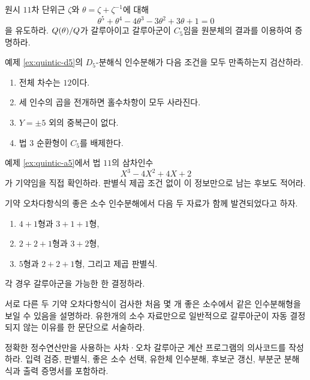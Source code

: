 \begin{exercise}[*]
원시 $11$차 단위근 $\zeta$와 $\theta=\zeta+\zeta^{-1}$에 대해
\[
  \theta^5+\theta^4-4\theta^3-3\theta^2+3\theta+1=0
\]
을 유도하라. $Q(\theta)/Q$가 갈루아이고 갈루아군이 $C_5$임을 원분체의 결과를 이용하여 증명하라.
\end{exercise}

\begin{exercise}
예제 \ref{ex:quintic-d5}의 $D_5$-분해식 인수분해가 다음 조건을 모두 만족하는지 검산하라.
\begin{enumerate}[label=(\alph*)]
  \item 전체 차수는 $12$이다.
  \item 세 인수의 곱을 전개하면 홀수차항이 모두 사라진다.
  \item $Y=\pm5$ 외의 중복근이 없다.
  \item 법 $3$ 순환형이 $C_5$를 배제한다.
\end{enumerate}
\end{exercise}

\begin{exercise}
예제 \ref{ex:quintic-a5}에서 법 $11$의 삼차인수
\[
  X^3-4X^2+4X+2
\]
가 기약임을 직접 확인하라. 판별식 제곱 조건 없이 이 정보만으로 남는 후보도 적어라.
\end{exercise}

\begin{exercise}
기약 오차다항식의 좋은 소수 인수분해에서 다음 두 자료가 함께 발견되었다고 하자.
\begin{enumerate}[label=(\alph*)]
  \item $4+1$형과 $3+1+1$형,
  \item $2+2+1$형과 $3+2$형,
  \item $5$형과 $2+2+1$형, 그리고 제곱 판별식.
\end{enumerate}
각 경우 갈루아군을 가능한 한 결정하라.
\end{exercise}

\begin{exercise}
서로 다른 두 기약 오차다항식이 검사한 처음 몇 개 좋은 소수에서 같은 인수분해형을 보일 수 있음을 설명하라. 유한개의 소수 자료만으로 일반적으로 갈루아군이 자동 결정되지 않는 이유를 한 문단으로 서술하라.
\end{exercise}

\begin{exercise}
정확한 정수연산만을 사용하는 사차·오차 갈루아군 계산 프로그램의 의사코드를 작성하라. 입력 검증, 판별식, 좋은 소수 선택, 유한체 인수분해, 후보군 갱신, 부분군 분해식과 출력 증명서를 포함하라.
\end{exercise}
